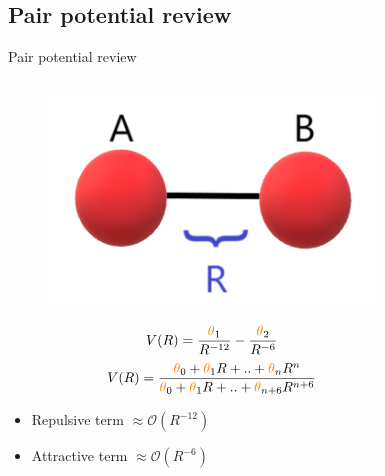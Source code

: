 \documentclass{beamer}
\begin{document}
\subsection{Pair potential review}
\begin{frame}{Pair potential review}
    \begin{columns}
        \begin{column}{0.5\textwidth}
            \begin{figure}[H]
                \centering
                    \includegraphics[scale=0.25]{img/slide/atompair.png}
                \label{fig:ozone}
            \end{figure}
            \begin{equation}
                V(R) = \frac{{\color{orange}\theta}_1}{R^{-12}} - \frac{{\color{orange}\theta}_2}{R^{-6}}
            \end{equation}
            \begin{equation}
                V(R) = \frac{{\color{orange}\theta}_0 + {\color{orange}\theta}_1R + .. + {\color{orange}\theta}_nR^n}{{\color{orange}\theta}_0 + {\color{orange}\theta}_1R + .. + {\color{orange}\theta}_{n+6}R^{n+6}}
            \end{equation}
            \begin{itemize}
                \item Repulsive term $\approx \mathcal{O}(R^{-12})$
                \item Attractive term $\approx \mathcal{O}(R^{-6})$
            \end{itemize}
        \end{column}
        \begin{column}{0.5\textwidth}
            \begin{figure}[htbp]
                \centering

\end{figure}
\end{column}
\end{columns}
\end{frame}
\end{document}
